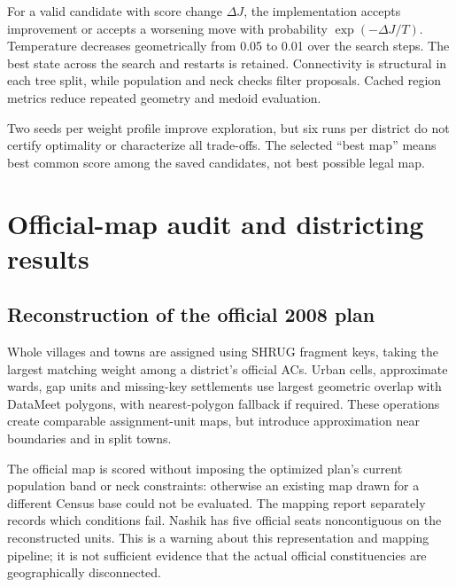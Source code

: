 \documentclass[11pt,a4paper,oneside]{report}
\newcommand{\source}[1]{\par\nopagebreak[4]{\footnotesize\color{teal}Evidence: #1.}\par}
\begin{document}
For a valid candidate with score change $\Delta J$, the implementation accepts improvement or accepts a worsening move with probability $\exp(-\Delta J/T)$. Temperature decreases geometrically from 0.05 to 0.01 over the search steps. The best state across the search and restarts is retained. Connectivity is structural in each tree split, while population and neck checks filter proposals. Cached region metrics reduce repeated geometry and medoid evaluation.

Two seeds per weight profile improve exploration, but six runs per district do not certify optimality or characterize all trade-offs. The selected ``best map'' means best common score among the saved candidates, not best possible legal map.
\source{[S2], [S5]}

\chapter{Official-map audit and districting results}
\section{Reconstruction of the official 2008 plan}
Whole villages and towns are assigned using SHRUG fragment keys, taking the largest matching weight among a district's official ACs. Urban cells, approximate wards, gap units and missing-key settlements use largest geometric overlap with DataMeet polygons, with nearest-polygon fallback if required. These operations create comparable assignment-unit maps, but introduce approximation near boundaries and in split towns.

The official map is scored without imposing the optimized plan's current population band or neck constraints: otherwise an existing map drawn for a different Census base could not be evaluated. The mapping report separately records which conditions fail. Nashik has five official seats noncontiguous on the reconstructed units. This is a warning about this representation and mapping pipeline; it is not sufficient evidence that the actual official constituencies are geographically disconnected.
\source{[S5]}
\end{document}
